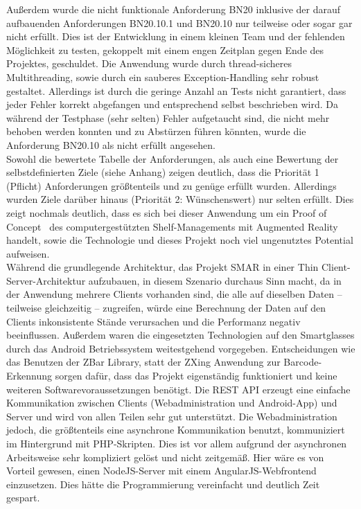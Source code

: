 Außerdem wurde die nicht funktionale Anforderung BN20 inklusive der darauf aufbauenden Anforderungen BN20.10.1 und BN20.10 nur teilweise oder sogar gar nicht erfüllt. Dies ist der Entwicklung in einem kleinen Team und der fehlenden Möglichkeit zu testen, gekoppelt mit einem engen Zeitplan gegen Ende des Projektes, geschuldet. Die Anwendung wurde durch thread-sicheres Multithreading, sowie durch ein sauberes Exception-Handling sehr robust gestaltet. Allerdings ist durch die geringe Anzahl an Tests nicht garantiert, dass jeder Fehler korrekt abgefangen und entsprechend selbst beschrieben wird. Da während der Testphase (sehr selten) Fehler aufgetaucht sind, die nicht mehr behoben werden konnten und zu Abstürzen führen könnten, wurde die Anforderung BN20.10 als nicht erfüllt angesehen.\\

Sowohl die bewertete Tabelle der Anforderungen, als auch eine Bewertung der selbstdefinierten Ziele (siehe Anhang) zeigen deutlich, dass die Priorität 1 (Pflicht) Anforderungen größtenteils und zu genüge erfüllt wurden. Allerdings wurden Ziele darüber hinaus (Priorität 2: Wünschenswert) nur selten erfüllt. Dies zeigt nochmals deutlich, dass es sich bei dieser Anwendung um ein \glqq Proof of Concept\grqq~ des computergestützten Shelf-Managements mit Augmented Reality handelt, sowie die Technologie und dieses Projekt noch viel ungenutztes Potential aufweisen.\\

Während die grundlegende Architektur, das Projekt \ac{SMAR} in einer Thin Client-Server-Architektur aufzubauen, in diesem Szenario durchaus Sinn macht, da in der Anwendung mehrere Clients vorhanden sind, die alle auf dieselben Daten -- teilweise gleichzeitig -- zugreifen, würde eine Berechnung der Daten auf den Clients inkonsistente Stände verursachen und die Performanz negativ beeinflussen. Außerdem waren die eingesetzten Technologien auf den Smartglasses durch das Android Betriebssystem weitestgehend vorgegeben. Entscheidungen wie \zB das Benutzen der ZBar Library, statt der ZXing Anwendung zur Barcode-Erkennung sorgen dafür, dass das Projekt eigenständig funktioniert und keine weiteren Softwarevoraussetzungen benötigt. Die \acs{REST} \acs{API} erzeugt eine einfache Kommunikation zwischen Clients (Webadministration und Android-App) und Server und wird von allen Teilen sehr gut unterstützt. Die Webadministration jedoch, die größtenteils eine asynchrone Kommunikation benutzt, kommuniziert im Hintergrund mit PHP-Skripten. Dies ist vor allem aufgrund der asynchronen Arbeitsweise sehr kompliziert gelöst und nicht zeitgemäß. Hier wäre es von Vorteil gewesen, einen NodeJS-Server mit einem AngularJS-Webfrontend einzusetzen. Dies hätte die Programmierung vereinfacht und deutlich Zeit gespart.\\

